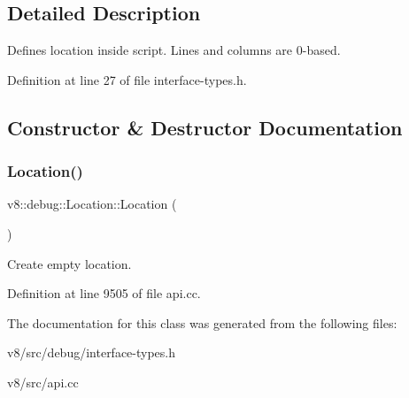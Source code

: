 \subsection{Detailed Description}
Defines location inside script. Lines and columns are 0-\/based. 

Definition at line 27 of file interface-\/types.\+h.



\subsection{Constructor \& Destructor Documentation}
\mbox{\label{classv8_1_1debug_1_1Location_a55c42476163daed1bd299cd28f0fb689}} 
\subsubsection{\texorpdfstring{Location()}{Location()}}
{\footnotesize\ttfamily v8\+::debug\+::\+Location\+::\+Location (\begin{DoxyParamCaption}{ }\end{DoxyParamCaption})}

Create empty location. 

Definition at line 9505 of file api.\+cc.



The documentation for this class was generated from the following files\+:\begin{DoxyCompactItemize}
\item 
v8/src/debug/interface-\/types.\+h\item 
v8/src/api.\+cc\end{DoxyCompactItemize}
